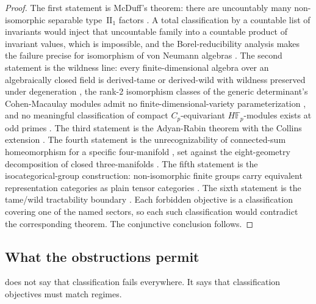 \documentclass[11pt,letterpaper]{article}
\theoremstyle{definition}
\begin{document}
\begin{proof}
The first statement is McDuff's theorem: there are uncountably many non-isomorphic separable type~$\mathrm{II}_1$ factors \cite{corpus-8,corpus-65}. A total classification by a countable list of invariants would inject that uncountable family into a countable product of invariant values, which is impossible, and the Borel-reducibility analysis makes the failure precise for isomorphism of von Neumann algebras \cite{corpus-59}. The second statement is the wildness line: every finite-dimensional algebra over an algebraically closed field is derived-tame or derived-wild with wildness preserved under degeneration \cite{corpus-55}, the rank-2 isomorphism classes of the generic determinant's Cohen-Macaulay modules admit no finite-dimensional-variety parameterization \cite{corpus-56}, and no meaningful classification of compact $C_p$-equivariant $H\mathbb{F}_p$-modules exists at odd primes \cite{corpus-58}. The third statement is the Adyan-Rabin theorem with the Collins extension \cite{corpus-53}. The fourth statement is the unrecognizability of connected-sum homeomorphism for a specific four-manifold \cite{corpus-54}, set against the eight-geometry decomposition of closed three-manifolds \cite{corpus-60,corpus-70}. The fifth statement is the isocategorical-group construction: non-isomorphic finite groups carry equivalent representation categories as plain tensor categories \cite{corpus-12}. The sixth statement is the tame/wild tractability boundary \cite{corpus-57}. Each forbidden objective is a classification covering one of the named sectors, so each such classification would contradict the corresponding theorem. The conjunctive conclusion follows.
\end{proof}

\subsection{What the obstructions permit}

 does not say that classification fails everywhere. It says that classification objectives must match regimes.
\end{document}
